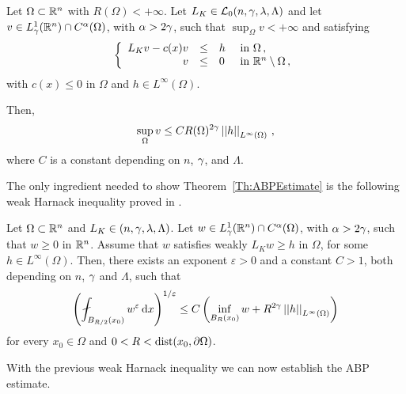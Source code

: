 \begin{theorem}
	\label{Th:ABPEstimate}
	Let $\Omega \subset \mathbb{R}^n$ with $R(\Omega) < +\infty$. Let $L_K \in \mathcal{L}_0(n,\gamma,\lambda, \Lambda)$ and let $v\in L^1_\gamma(\mathbb{R}^n)\cap C^{\alpha}(\Omega)$, with $\alpha > 2\gamma$, such that $\sup_{\Omega} v < +\infty$ and satisfying
	$$
	\left\{\begin{array}{rcll}
	L_K v - c(x)v &\leq & h & \text{ in } \Omega\,, \\
	v & \leq & 0 & \text{ in } \mathbb{R}^n\setminus \Omega\,,
	\end{array} \right.
	$$
	with $c(x)\leq 0$ in $\Omega$ and $h\in L^\infty(\Omega)$.
	
	Then,
	$$
	\sup_\Omega v \leq C R(\Omega)^{2\gamma} \left | \left |{h} \right | \right |_{L^{\infty}(\Omega)}\,,
	$$
	where $C$ is a constant depending on $n$, $\gamma$, and $\Lambda$.
\end{theorem}


The only ingredient needed to show Theorem~\ref{Th:ABPEstimate} is the following weak Harnack inequality proved in  \cite{Cozzi-DeGiorgiClassesShort}.

\begin{proposition}
	
	\label{Prop:WeakHarnack}
		
	Let $\Omega \subset \mathbb{R}^n$ and $L_K\in (n,\gamma,\lambda, \Lambda)$. Let $w \in L^1_\gamma(\mathbb{R}^n)\cap C^{\alpha}(\Omega)$, with $\alpha > 2\gamma$, such that $w\geq 0$ in $\mathbb{R}^n$. Assume that $w$ satisfies weakly $L_K w \geq h$ in $\Omega$, for some $h\in L^\infty (\Omega)$. Then, there exists an exponent $\varepsilon > 0 $  and a constant $C > 1$, both depending on $n$, $\gamma$ and $\Lambda$, such that
	$$
	 \bpar{ \fint_{B_{R/2}(x_0)} w^\varepsilon \d x}^{1/\varepsilon} \leq C \bpar{\inf_{B_{R}(x_0)} w + R^{2\s} \norm{h}_{L^{\infty}(\Omega)} }
	$$
	for every $x_0\in \Omega$ and $0<R<\operatorname{dist}(x_0, \partial \Omega)$.
\end{proposition}

With the previous weak Harnack inequality we can now establish the ABP estimate.

